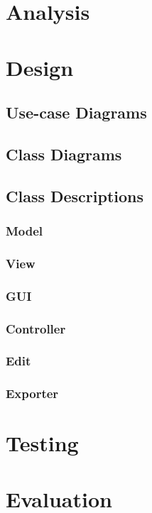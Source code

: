 \documentclass[a4paper]{article}
\begin{document}

\newpage
\tableofcontents 
\newpage

\section{Analysis}
	
\section{Design}
	\subsection{Use-case Diagrams}
	\subsection{Class Diagrams}
	\subsection{Class Descriptions}
		\subsubsection{Model}
		\subsubsection{View}
		\subsubsection{GUI}
		\subsubsection{Controller}
		\subsubsection{Edit}
		\subsubsection{Exporter}
\section{Testing}
\section{Evaluation}
\end{document}
